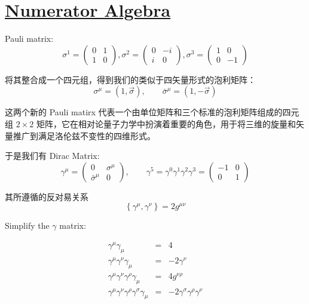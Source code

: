 \section{\protect\hyperlink{:}{Numerator Algebra}}
Pauli matrix:
\begin{equation}
    \sigma^1 = 
    \begin{pmatrix}
        0 & 1 \\
        1 & 0
    \end{pmatrix},
    \sigma^2 =
    \begin{pmatrix}
        0 & -i \\
        i & 0
    \end{pmatrix},
    \sigma^3 =
    \begin{pmatrix}
        1 & 0 \\
        0 & -1
    \end{pmatrix}
\end{equation}

将其整合成一个四元组，得到我们的类似于四矢量形式的泡利矩阵：
\begin{equation}
    \sigma^\mu = \left(1,\vec{\sigma}\right),\qquad \bar{\sigma}^\mu = \left(1,-\vec{\sigma}\right)
\end{equation}

这两个新的 Pauli matirx 代表一个由单位矩阵和三个标准的泡利矩阵组成的四元组 $2 \times 2$ 矩阵，它在相对论量子力学中扮演着重要的角色，用于将三维的旋量和矢量推广到满足洛伦兹不变性的四维形式。

于是我们有 Dirac Matrix:
\begin{equation}
    \gamma^\mu = 
    \begin{pmatrix}
        0 & \sigma^\mu \\
        \bar{\sigma}^\mu & 0
    \end{pmatrix},
    \qquad \gamma^5 = \gamma^0\gamma^1\gamma^2\gamma^3 = 
    \begin{pmatrix}
        -1 & 0 \\
        0 & 1
    \end{pmatrix}
\end{equation}

其所遵循的反对易关系
\begin{equation}
    \left\{\gamma^\mu,\gamma^\nu\right\} = 2 g^{\mu\nu}
\end{equation}


Simplify the $\gamma$ matrix\cite{book02}:

\begin{eqnarray*}
    \gamma^\mu \gamma_\mu &=& 4 \\
    \gamma^\mu \gamma^\nu \gamma_\mu &=& -2 \gamma^\nu \\
    \gamma^\mu \gamma^\nu \gamma^\rho \gamma_\mu &=& 4 g^{\nu\rho} \\
    \gamma^\mu \gamma^\nu \gamma^\rho \gamma^\sigma \gamma_\mu &=& -2 \gamma^\sigma \gamma^\rho \gamma^\nu
\end{eqnarray*}

